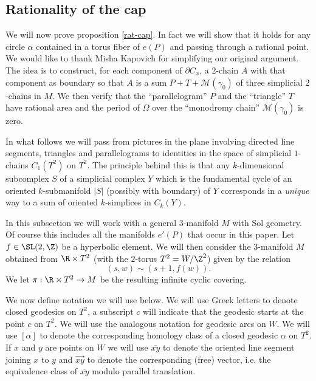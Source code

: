 \subsection{Rationality of the cap}\label{rat-cap11}
We will now prove proposition \ref{rat-cap}.  In fact we will show
that it holds for any circle $\alpha$ contained in a torus fiber
of $e(P)$ and passing through a rational point. We would like to
thank Misha Kapovich for simplifying  our original argument. The
idea is to construct, for each component of $\partial C_x$, a
$2$-chain $A$ with that component as boundary so that $A$ is a sum
$P+ T  +\mathcal{M}(\gamma_0)$ of three simplicial $2$-chains in
$M$. We then verify that the ``parallelogram'' $P$  and the ``triangle''
$T$  have rational area and the period of $\Omega$ over the ``monodromy
chain'' $\mathcal{M}(\gamma_0)$ is zero.

In what follows we will pass from pictures in the plane involving
directed line segments, triangles and parallelograms to identities
in the space of simplicial $1$-chains $C_1(T^2)$  on $T^2$. The
principle behind this is that any $k$-dimensional subcomplex $S$
of a simplicial complex $Y$ which is the fundamental cycle of an
oriented $k$-submanifold $|S|$ (possibly with boundary) of $Y$
corresponds in a {\it unique} way to a sum of oriented $k$-simplices
in $C_k(Y)$.



In this subsection we will work with a general $3$-manifold $M$
with Sol geometry. Of course this includes all the manifolds $e'(P)$
that occur in this paper. Let $f \in \SL(2,\Z)$ be a hyperbolic
element. We will then consider the $3$-manifold $M$ obtained from
$ \R \times T^2$ (with the $2$-torus $T^2 = W/ \Z^2$) given by the
relation
\begin{equation}\label{glueing}
(s,w) \sim (s+1,f(w)).  
\end{equation}
We let $\pi: \R\times T^2 \to M$ be the resulting infinite cyclic covering. 



We now define notation we will use below. We will use Greek letters
to denote closed geodesics on $T^2$, a subscript $c$  will indicate
that the geodesic starts at the point $c$ on $T^2$. We will use the
analogous notation for geodesic arcs on $W$.  We will use $[\alpha]$
to denote the corresponding homology class of a closed geodesic $\alpha$ on $T^2$. 
If $x$ and $y$ are points on $W$ we will use $\overline{xy}$ to
denote the oriented line segment joining $x$ to $y$ and
$\overrightarrow{xy}$ to denote the corresponding (free) vector,
i.e. the equivalence class of $\overline{xy}$ modulo parallel translation. 
   
